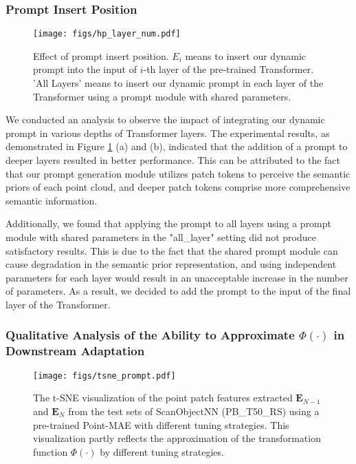 \documentclass[10pt,twocolumn,letterpaper]{article}
\begin{document}
\subsubsection{Prompt Insert Position} 
\label{subsubsec:prompt_insert}

\begin{figure}[t]
\centering
\texttt{[image: figs/hp\_layer\_num.pdf]} 
\caption{Effect of prompt insert position. $E_i$ means to insert our dynamic prompt into the input of $i$-th layer of the pre-trained Transformer. 'All Layers' means to insert our dynamic prompt in each layer of the Transformer using a prompt module with shared parameters.}
\label{abl_layer}
\end{figure}

We conducted an analysis to observe the impact of integrating our dynamic prompt in various depths of Transformer layers. The experimental results, as demonstrated in Figure \ref{abl_layer} (a) and (b), indicated that the addition of a prompt to deeper layers resulted in better performance. This can be attributed to the fact that our prompt generation module utilizes patch tokens to perceive the semantic priors of each point cloud, and deeper patch tokens comprise more comprehensive semantic information.


Additionally, we found that applying the prompt to all layers using a prompt module with shared parameters in the "all\_layer" setting did not produce satisfactory results. This is due to the fact that the shared prompt module can cause degradation in the semantic prior representation, and using independent parameters for each layer would result in an unacceptable increase in the number of parameters. As a result, we decided to add the prompt to the input of the final layer of the Transformer.

\subsubsection{Qualitative Analysis of the Ability to Approximate $\Phi(\cdot)$ in Downstream Adaptation} 

\begin{figure}[t]
\centering
\texttt{[image: figs/tsne\_prompt.pdf]} 
\caption{The t-SNE visualization of the point patch features extracted $\bm E_{N-1}$ and $\bm E_{N}$ from the test sets of ScanObjectNN (PB\_T50\_RS) using a pre-trained Point-MAE with different tuning strategies. This visualization partly reflects the approximation of the transformation function $\Phi(\cdot)$ by different tuning strategies.}
\label{tsne_prompt}
\end{figure}
\end{document}
